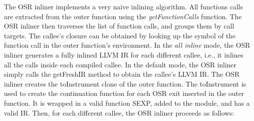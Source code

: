 The OSR inliner implements a very naive inlining algorithm.
All functions calls are extracted from the outer function using the \textit{getFunctionCalls} function.
The OSR inliner then traverses the list of function calls, and groups them by call targets.
The callee's closure can be obtained by looking up the symbol of the function call in the outer function's environment.
In the \textit{all inline} mode, the OSR inliner generates a fully inlined LLVM IR for each different callee, i.e., it inlines all the calls inside each compiled callee. 
In the default mode, the OSR inliner simply calls the getFreshIR method to obtain the callee's LLVM IR.
The OSR inliner creates the toInstrument clone of the outer function.
The toInstrument is used to create the continuation function for each OSR exit inserted in the outer function.
It is wrapped in a valid function SEXP, added to the module, and has a valid IR.
Then, for each different callee, the OSR inliner proceeds as follows: 

